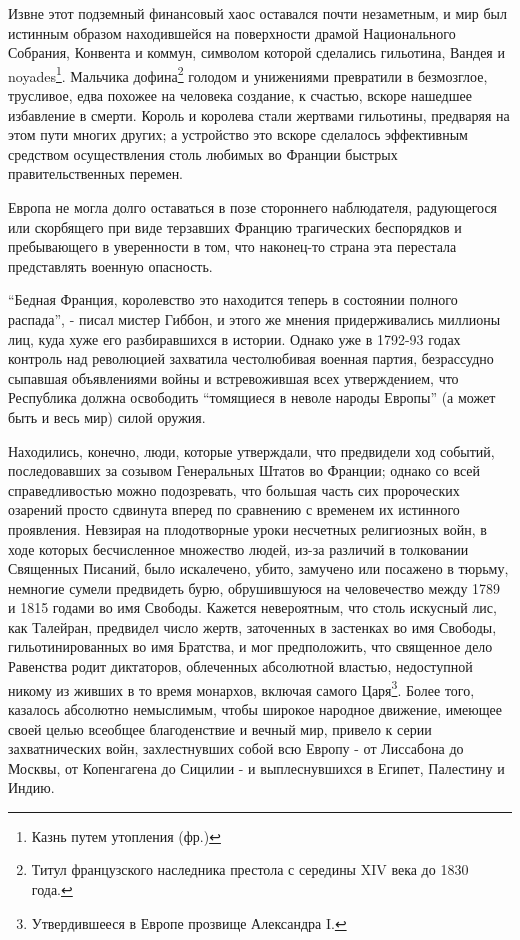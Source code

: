 \documentclass[
  oneside,
  12pt,
  titlepage]{book}
\begin{document}
Извне этот подземный финансовый хаос оставался почти незаметным, и мир был истинным образом находившейся на поверхности драмой Национального Собрания, Конвента и коммун, символом которой сделались гильотина, Вандея и noyades\footnote{Казнь путем утопления (фр.)}. Мальчика дофина\footnote{Титул французского наследника престола с середины XIV века до 1830 года.} голодом и унижениями превратили в безмозглое, трусливое, едва похожее на человека создание, к счастью, вскоре нашедшее избавление в смерти. Король и королева стали жертвами гильотины, предваряя на этом пути многих других; а устройство это вскоре сделалось эффективным средством осуществления столь любимых во Франции быстрых правительственных перемен.

Европа не могла долго оставаться в позе стороннего наблюдателя, радующегося или скорбящего при виде терзавших Францию трагических беспорядков и пребывающего в уверенности в том, что наконец-то страна эта перестала представлять военную опасность.

``Бедная Франция, королевство это находится теперь в состоянии полного распада'', - писал мистер Гиббон, и этого же мнения придерживались миллионы лиц, куда хуже его разбиравшихся в истории. Однако уже в 1792-93 годах контроль над революцией захватила честолюбивая военная партия, безрассудно сыпавшая объявлениями войны и встревожившая всех утверждением, что Республика должна освободить ``томящиеся в неволе народы Европы'' (а может быть и весь мир) силой оружия.

Находились, конечно, люди, которые утверждали, что предвидели ход событий, последовавших за созывом Генеральных Штатов во Франции; однако со всей справедливостью можно подозревать, что большая часть сих пророческих озарений просто сдвинута вперед по сравнению с временем их истинного проявления. Невзирая на плодотворные уроки несчетных религиозных войн, в ходе которых бесчисленное множество людей, из-за различий в толковании Священных Писаний, было искалечено, убито, замучено или посажено в тюрьму, немногие сумели предвидеть бурю, обрушившуюся на человечество между 1789 и 1815 годами во имя Свободы. Кажется невероятным, что столь искусный лис, как Талейран, предвидел число жертв, заточенных в застенках во имя Свободы, гильотинированных во имя Братства, и мог предположить, что священное дело Равенства родит диктаторов, облеченных абсолютной властью, недоступной никому из живших в то время монархов, включая самого Царя\footnote{Утвердившееся в Европе прозвище Александра I.}. Более того, казалось абсолютно немыслимым, чтобы широкое народное движение, имеющее своей целью всеобщее благоденствие и вечный мир, привело к серии захватнических войн, захлестнувших собой всю Европу - от Лиссабона до Москвы, от Копенгагена до Сицилии - и выплеснувшихся в Египет, Палестину и Индию.
\end{document}
